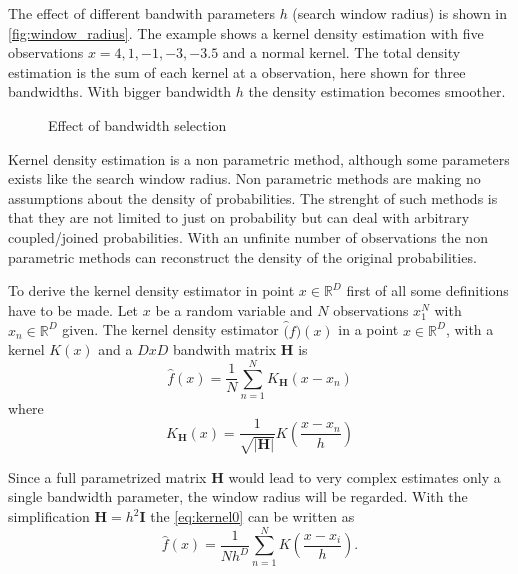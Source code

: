 The effect of different bandwith parameters $h$ (search window radius) is shown in 
\autoref{fig:window_radius}. The example shows a kernel density estimation with
five observations $x = 4, 1, -1, -3, -3.5$ and a normal kernel. The total density
estimation is the sum of each kernel at a observation, here shown for three 
bandwidths. With bigger bandwidth $h$ the density estimation becomes smoother.  

\begin{figure}[ht]
\centering
\caption{Effect of bandwidth selection}
\label{fig:window_radius}
\end{figure}


Kernel density estimation is a non parametric method, although some parameters
exists like the search window radius. Non parametric methods are making no 
assumptions about the density of probabilities. The strenght of such methods is
that they are not limited to just on probability but can deal with arbitrary
coupled/joined probabilities. With an unfinite number of observations the non
parametric methods can reconstruct the density of the original
probabilities.

To derive the kernel density estimator in point $x \in \mathbb{R}^D$ first of
all some definitions have to be made. Let $x$ be a random variable and $N$
observations $x_1^N$ with $x_n \in \mathbb{R}^D$ given. The kernel density
estimator $\hat(f)(x)$ in a point $x \in \mathbb{R}^D$, with a kernel $K(x)$ and a
$DxD$ bandwith matrix $\mathbf{H}$ is 
\begin{equation}\label{eq:kernel0}
	\hat{f}(x) = \frac{1}{N} \sum_{n = 1}^N K_{\mathbf{H}}\left( x-x_n \right)
\end{equation} 
where
\begin{equation}\label{eq:kernel1}
	K_{\mathbf{H}}(x) = \frac{1}{\sqrt{|\mathbf{H}|}}K \left( \frac{x - x_n}{h} \right)
\end{equation} 

Since a full parametrized matrix $\mathbf{H}$ would lead to very complex estimates
only a single bandwidth parameter, the window radius will be regarded. With the
simplification $\mathbf{H} = h^2 \mathbf{I}$ the \autoref{eq:kernel0} can be 
written as
\begin{equation}\label{eq:kernel2}
	\hat{f}(x) = \frac{1}{Nh^D}\sum_{n=1}^N K\left( \frac{x - x_i}{h} \right).
\end{equation}

